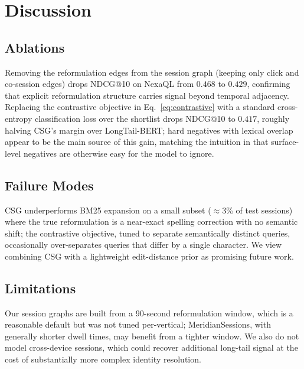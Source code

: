 \section{Discussion}
\label{sec:discussion}

\subsection{Ablations}

Removing the reformulation edges from the session graph (keeping only click and
co-session edges) drops NDCG@10 on NexaQL from $0.468$ to $0.429$, confirming that
explicit reformulation structure carries signal beyond temporal adjacency. Replacing
the contrastive objective in Eq.~\eqref{eq:contrastive} with a standard
cross-entropy classification loss over the shortlist drops NDCG@10 to $0.417$,
roughly halving CSG's margin over LongTail-BERT; hard negatives with lexical overlap
appear to be the main source of this gain, matching the intuition in
\citet{Csikos2021Reformulation} that surface-level negatives are otherwise easy for
the model to ignore.

\subsection{Failure Modes}

CSG underperforms BM25 expansion on a small subset ($\approx$3\% of test sessions)
where the true reformulation is a near-exact spelling correction with no semantic
shift; the contrastive objective, tuned to separate semantically distinct queries,
occasionally over-separates queries that differ by a single character. We view
combining CSG with a lightweight edit-distance prior as promising future work.

\subsection{Limitations}

Our session graphs are built from a 90-second reformulation window, which is a
reasonable default but was not tuned per-vertical; MeridianSessions, with generally
shorter dwell times, may benefit from a tighter window. We also do not model
cross-device sessions, which could recover additional long-tail signal at the cost of
substantially more complex identity resolution.
